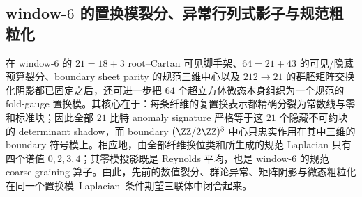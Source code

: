 \subsection{window-\texorpdfstring{$6$}{6} 的置换模裂分、异常行列式影子与规范粗粒化}\label{subsec:conclusion-window6-permutation-module-laplacian-reynolds}

在 window-\(6\) 的 \(21=18+3\) root--Cartan 可见脚手架、\(64=21+43\) 的可见/隐藏预算裂分、boundary sheet parity 的规范三维中心以及 \(212\to 21\) 的群胚矩阵交换化阴影都已固定之后，还可进一步把 \(64\) 个超立方体微态本身组织为一个规范的 fold-gauge 置换模。其核心在于：每条纤维的复置换表示都精确分裂为常数线与零和标准块；因此全部 \(21\) 比特 anomaly signature 严格等于这 \(21\) 个隐藏不可约块的 determinant shadow，而 boundary \((\ZZ/2\ZZ)^3\) 中心只忠实作用在其中三维的 boundary 符号模上。相应地，由全部纤维换位类和所生成的规范 Laplacian 只有四个谱值 \(0,2,3,4\)；其零模投影既是 Reynolds 平均，也是 window-\(6\) 的规范 coarse-graining 算子。由此，先前的数值裂分、群论异常、矩阵阴影与微态粗粒化在同一个置换模--Laplacian--条件期望三联体中闭合起来。

